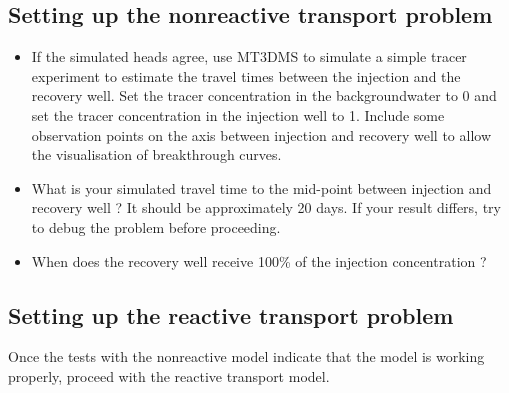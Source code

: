\subsection[Setting up the nonreactive transport problem]{Setting up the nonreactive transport problem}

\begin{itemize}

\item If the simulated heads agree, use MT3DMS to simulate a simple tracer experiment
to estimate the travel times between the injection and the recovery well. 
Set the tracer concentration in the backgroundwater to 0 and set the tracer concentration
in the injection well to 1. Include some observation points on the axis between injection and recovery well to allow the visualisation
of breakthrough curves.

\item What is your simulated travel time to the mid-point between 
injection and recovery well ? It should be approximately 20 days.
If your result differs, try to debug the problem before proceeding.

\item When does the recovery well receive 100\% of the injection concentration ? 

\end{itemize} 

\subsection[Setting up the reactive transport problem]{Setting up the reactive transport problem}

Once the tests with the nonreactive model indicate that the model is working properly,
proceed with the reactive transport model. 

